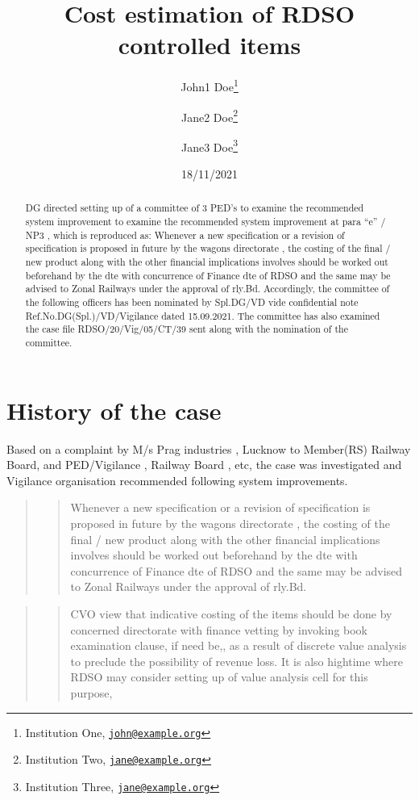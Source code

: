 \documentclass[
  11pt,
  twoside]{article}
\title{Cost estimation of RDSO controlled items}
\author{John1 Doe\footnote{Institution One, \href{mailto:john@example.org}{\nolinkurl{john@example.org}}} \and Jane2 Doe\footnote{Institution Two, \href{mailto:jane@example.org}{\nolinkurl{jane@example.org}}} \and Jane3 Doe\footnote{Institution Three, \href{mailto:jane@example.org}{\nolinkurl{jane@example.org}}}}
\date{18/11/2021}
\begin{document}
\maketitle
\begin{abstract}
DG directed setting up of a committee of 3 PED's to examine the recommended system improvement to examine the recommended system improvement at para ``e'' / NP3 , which is reproduced as: Whenever a new specification or a revision of specification is proposed in future by the wagons directorate , the costing of the final / new product along with the other financial implications involves should be worked out beforehand by the dte with concurrence of Finance dte of RDSO and the same may be advised to Zonal Railways under the approval of rly.Bd. Accordingly, the committee of the following officers has been nominated by Spl.DG/VD vide confidential note Ref.No.DG(Spl.)/VD/Vigilance dated 15.09.2021. The committee has also examined the case file RDSO/20/Vig/05/CT/39 sent along with the nomination of the committee.
\end{abstract}

{
\hypersetup{linkcolor=}
\setcounter{tocdepth}{3}
\tableofcontents
}
\tableofcontents

\hypertarget{history-of-the-case}{%
\section{History of the case}\label{history-of-the-case}}

Based on a complaint by M/s Prag industries , Lucknow to Member(RS) Railway Board, and PED/Vigilance , Railway Board , etc, the case was investigated and Vigilance organisation recommended following system improvements.

\begin{quote}
\begin{quote}
Whenever a new specification or a revision of specification is proposed in future by the wagons directorate , the costing of the final / new product along with the other financial implications involves should be worked out beforehand by the dte with concurrence of Finance dte of RDSO and the same may be advised to Zonal Railways under the approval of rly.Bd.
\end{quote}
\end{quote}

\begin{quote}
\begin{quote}
CVO view that indicative costing of the items should be done by concerned directorate with finance vetting by invoking book examination clause, if need be,, as a result of discrete value analysis to preclude the possibility of revenue loss. It is also hightime where RDSO may consider setting up of value analysis cell for this purpose,
\end{quote}
\end{quote}
\end{document}
